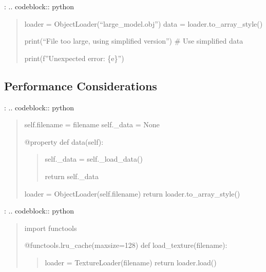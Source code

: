 \documentclass[a4paper,10pt,english,openany,oneside]{sphinxmanual}
\begin{document}
\sphinxAtStartPar
{}:
.. code\sphinxhyphen{}block:: python
\begin{quote}
\begin{description}
\sphinxAtStartPar
loader = ObjectLoader(“large\_model.obj”)
data = loader.to\_array\_style()

\sphinxAtStartPar
print(“File too large, using simplified version”)
\# Use simplified data

\sphinxAtStartPar
print(f”Unexpected error: \{e\}”)

\end{description}
\end{quote}


\subsection{Performance Considerations}
\label{\detokenize{api/utils:performance-considerations}}
\sphinxAtStartPar
{}:
.. code\sphinxhyphen{}block:: python
\begin{quote}
\begin{description}
\begin{description}
\sphinxAtStartPar
self.filename = filename
self.\_data = None

\end{description}

\sphinxAtStartPar
@property
def data(self):
\begin{quote}
\begin{description}
\sphinxAtStartPar
self.\_data = self.\_load\_data()

\end{description}

\sphinxAtStartPar
return self.\_data
\end{quote}
\begin{description}
\sphinxAtStartPar
loader = ObjectLoader(self.filename)
return loader.to\_array\_style()

\end{description}

\end{description}
\end{quote}

\sphinxAtStartPar
{}:
.. code\sphinxhyphen{}block:: python
\begin{quote}

\sphinxAtStartPar
import functools

\sphinxAtStartPar
@functools.lru\_cache(maxsize=128)
def load\_texture(filename):
\begin{quote}

\sphinxAtStartPar
loader = TextureLoader(filename)
return loader.load()
\end{quote}
\end{quote}
\end{document}
